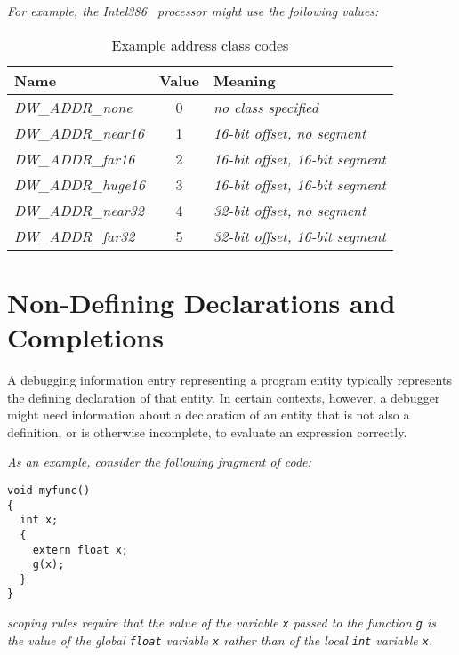 \textit {For example, the Intel386 \texttrademark\  processor might use the following values:}

\begin{table}[here]
\caption{Example address class codes}
\label{tab:inteladdressclasstable}
\centering
\begin{tabular}{l|c|l}
\hline
Name&Value&Meaning  \\
\hline
\textit{DW\_ADDR\_none}&   0 & \textit{no class specified} \\
\textit{DW\_ADDR\_near16}& 1 & \textit{16-bit offset, no segment} \\
\textit{DW\_ADDR\_far16}&  2 & \textit{16-bit offset, 16-bit segment} \\
\textit{DW\_ADDR\_huge16}& 3 & \textit{16-bit offset, 16-bit segment} \\
\textit{DW\_ADDR\_near32}& 4 & \textit{32-bit offset, no segment} \\
\textit{DW\_ADDR\_far32}&  5 & \textit{32-bit offset, 16-bit segment} \\
\hline
\end{tabular}
\end{table}

\section{Non-Defining Declarations and Completions}
\label{nondefiningdeclarationsandcompletions}
A debugging information entry representing a program entity
typically represents the defining declaration of that
entity. In certain contexts, however, a debugger might need
information about a declaration of an entity that is not
also a definition, or is otherwise incomplete, to evaluate
\hypertarget{chap:DWATdeclarationincompletenondefiningorseparateentitydeclaration}{}
an expression correctly.

\textit{As an example, consider the following fragment of  code:}

\begin{lstlisting}
void myfunc()
{
  int x;
  {
    extern float x;
    g(x);
  }
}
\end{lstlisting}


\textit{ scoping rules require that the 
value of the variable \texttt{x} passed to the function 
\texttt{g} is the value of the global \texttt{float} 
variable \texttt{x} rather than of the local \texttt{int} 
variable \texttt{x}.}

